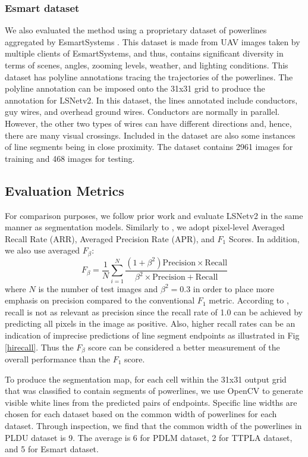 \documentclass[journal]{IEEEtran}
\begin{document}
\subsubsection{Esmart dataset}
We also evaluated the method using a proprietary dataset of powerlines aggregated by EsmartSystems \cite{esmart_website}. This dataset is made from UAV images taken by multiple clients of EsmartSystems, and thus, contains significant diversity in terms of scenes, angles, zooming levels, weather, and lighting conditions. This dataset has polyline annotations tracing the trajectories of the powerlines. The polyline annotation can be imposed onto the 31x31 grid to produce the annotation for LSNetv2.
In this dataset, the lines annotated include conductors, guy wires, and overhead ground wires. Conductors are normally in parallel. However, the other two types of wires can have different directions and, hence, there are many visual crossings. Included in the dataset are also some instances of line segments being in close proximity. The dataset contains 2961 images for training and 468 images for testing.


\subsection{Evaluation Metrics}\label{evaluation_metrics}
For comparison purposes, we follow prior work \cite{Nguyen2020} and evaluate LSNetv2 in the same manner as segmentation models.
Similarly to \cite{Nguyen2020}, we adopt pixel-level Averaged Recall Rate (ARR), Averaged Precision Rate (APR), and $F_1$ Scores. In addition, we also use averaged $F_{\beta}$:
\begin{equation}
  F_{\beta} = \frac{1}{N} \sum_{i=1}^N  \frac{(1 + \beta^2)\text{Precision} \times \text{Recall}}{\beta^2 \times \text{Precision} + \text{Recall}} 
\end{equation}
where $N$ is the number of test images and $\beta^2 = 0.3$ in order to place more emphasis on precision compared to the conventional $F_1$ metric. According to \cite{f_beta0, f_beta1}, recall is not as relevant as precision since the recall rate of 1.0 can be achieved by predicting all pixels in the image as positive. Also, %
higher recall rates can be an indication of imprecise predictions of line segment endpoints as illustrated in Fig \ref{hirecall}. Thus the $F_{\beta}$ score can be considered a better measurement of the overall performance than the $F_1$ score.

To produce the segmentation map, for each cell within the 31x31 output grid that was classified to contain segments of powerlines, we use OpenCV to generate visible white lines from the predicted pairs of endpoints. Specific line widths are chosen for each dataset based on the common width of powerlines for each dataset. Through inspection, we find that the common width of the powerlines in PLDU dataset is 9. The average is 6 for PDLM dataset, 2 for TTPLA dataset, and 5 for Esmart dataset. 
\end{document}
